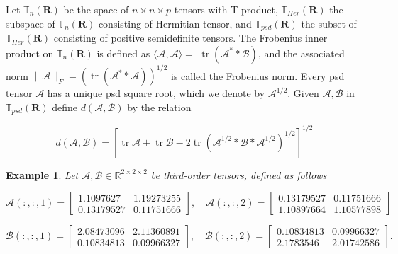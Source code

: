 \documentclass[oupthm]{CUP-JNL-BCM}%
\theoremstyle{oupplain}
\theoremstyle{oupdefinition}
\theoremstyle{oupremark}
\newtheorem{example}[theorem]{Example}
\theoremstyle{oupproof}
\numberwithin{equation}{section}
\begin{document}
Let $\mathbb{T}_{n}(\mathbf{R})$ be the space of $n \times n \times p$ tensors with T-product, $\mathbb{T}_{Her}(\mathbf{R})$ the subspace of $\mathbb{T}_{n}(\mathbf{R})$ consisting of Hermitian tensor, and $\mathbb{T}_{psd}(\mathbf{R})$ the subset of $\mathbb{T}_{Her}(\mathbf{R})$ consisting of positive semidefinite tensors. The Frobenius inner product on $\mathbb{T}_{n}(\mathbf{R})$ is defined as $\langle \mathcal{A}, \mathcal{A}\rangle=$ $\operatorname{tr} (\mathcal{A}^* *\mathcal{B})$, and the associated norm $\|\mathcal{A}\|_F=\left(\operatorname{tr} (\mathcal{A}^** \mathcal{A})\right)^{1 / 2}$ is called the Frobenius norm. Every psd tensor $\mathcal{A}$ has a unique psd square root, which we denote by $\mathcal{A}^{1 / 2}$. Given $\mathcal{A}, \mathcal{B}$ in $\mathbb{T}_{psd}(\mathbf{R})$ define $d(\mathcal{A}, \mathcal{B})$ by the relation

\begin{equation}\label{metric}
    d(\mathcal{A}, \mathcal{B})=\left[\operatorname{tr} \mathcal{A}+\operatorname{tr} \mathcal{B}-2 \operatorname{tr}\left(\mathcal{A}^{1 / 2}*\mathcal{B}*\mathcal{A}^{1 / 2}\right)^{1 / 2}\right]^{1 / 2}
\end{equation} 


\begin{example}

 Let \(\mathcal{A}, \mathcal{B} \in \mathbb{R}^{2 \times 2 \times 2}\) be third-order tensors, defined as follows

\[
\mathcal{A}(:, :, 1) = \begin{bmatrix} 1.1097627 & 1.19273255 \\ 0.13179527 & 0.11751666 \end{bmatrix}, \quad  
\mathcal{A}(:, :, 2) = \begin{bmatrix} 0.13179527 & 0.11751666 \\ 1.10897664 & 1.10577898 \end{bmatrix}
\]  

\[
\mathcal{B}(:, :, 1) = \begin{bmatrix} 2.08473096 & 2.11360891 \\ 0.10834813 & 0.09966327 \end{bmatrix}, \quad  
\mathcal{B}(:, :, 2) = \begin{bmatrix} 0.10834813 & 0.09966327 \\ 2.1783546 & 2.01742586 \end{bmatrix}.
\]  

\end{example}
\end{document}
